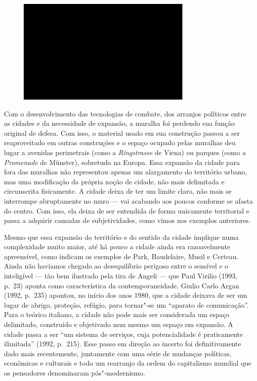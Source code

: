 \begin{figure}[!ht]
\centering
 \includegraphics[width=85mm]{./imgs/im1.jpg}
\caption{\tiny{}}
\end{figure}

Com o desenvolvimento das tecnologias de combate, dos arranjos políticos
entre as cidades e da necessidade de expansão, a muralha foi perdendo
sua função original de defesa. Com isso, o material usado em sua
construção passou a ser reaproveitado em outras construções e o espaço
ocupado pelas muralhas deu lugar a avenidas perimetrais (como a
\emph{Ringstrasse} de Viena) ou parques (como a \emph{Promenade} de
Münster), sobretudo na Europa. Essa expansão da cidade para fora das
muralhas não representou apenas um alargamento do território urbano, mas
uma modificação da própria noção de cidade, não mais delimitada e
circunscrita fisicamente. A cidade deixa de ter um limite claro, não
mais se interrompe abruptamente no muro --- vai acabando aos poucos
conforme se afasta do centro. Com isso, ela deixa de ser entendida de
forma unicamente territorial e passa a adquirir camadas de subjetividades,
como vimos nos exemplos anteriores.

Mesmo que essa expansão do território e do sentido da cidade implique
numa complexidade muito maior, até há pouco a cidade ainda era
razoavelmente apreensível, como indicam os exemplos de Park, Baudelaire,
Musil e Certeau. Ainda não havíamos chegado ao desequilíbrio perigoso
entre o sensível e o inteligível --- tão bem ilustrado pela tira de
Angeli --- que Paul Virilio (1993, p.~23) aponta como característica da
contemporaneidade. Giulio Carlo Argan (1992, p.~235) apontou, no início
dos anos 1980, que a cidade deixava de ser um lugar de abrigo, proteção,
refúgio, para tornar"-se um ``aparato de comunicação''. Para o teórico
italiano, a cidade não pode mais ser considerada um espaço delimitado,
construído e objetivado nem mesmo um espaço em expansão. A cidade passa
a ser ``um sistema de serviços, cuja potencialidade é praticamente
ilimitada'' (1992, p.~215). Esse passo em direção ao incerto foi
definitivamente dado mais recentemente, juntamente com uma série de
mudanças políticas, econômicas e culturais e todo um rearranjo da ordem
do capitalismo mundial que os pensadores denominaram pós"-modernismo.

